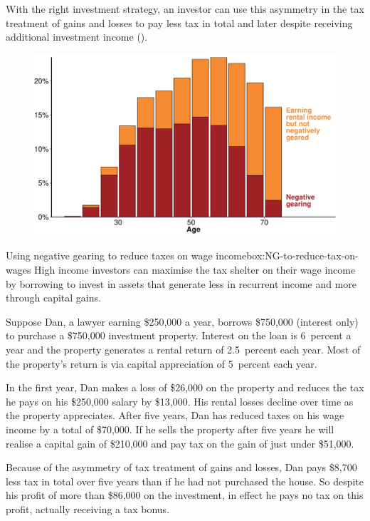 With the right investment strategy, an investor can use this asymmetry
in the tax treatment of gains and losses to pay less tax in total and
later despite receiving additional investment income ().

\begin{figure}[p]

\includegraphics[width=1.22\columnwidth]{./CGT-NG-atlas/NG-PG-by-age-protrude.pdf}
\end{figure}

\begin{smallbox}{Using negative gearing to reduce taxes on wage income}{box:NG-to-reduce-tax-on-wages}
High income investors can maximise the tax shelter on their wage income
by borrowing to invest in assets that generate less in recurrent income
and more through capital gains.



Suppose Dan, a lawyer earning \$250,000 a year, 
borrows \$750,000 %
(interest only)
to purchase a \$750,000 investment property. Interest on the loan is 6~percent a
year and the property generates a rental return of 2.5~percent each
year. Most of the property's return is via capital appreciation of 5~percent each year.

In the first year, Dan makes a loss of \$26,000 
on the property and
reduces the tax he pays on his \$250,000 salary by 
\$13,000. His rental
losses decline over time as the property appreciates. After five years,
Dan has reduced taxes on his wage income by a total of 
\$70,000. If he
sells the property after five years he will realise a capital gain of
\$210,000 and pay tax on 
the gain of just under \$51,000.

Because of the asymmetry of tax treatment of gains and losses, Dan pays
\$8,700 less tax in total over five years than if he had not purchased
the house. So despite his profit of more than \$86,000 on the
investment, in effect he pays no tax on this profit, actually receiving a tax bonus.
\end{smallbox}

